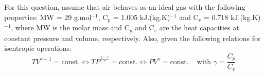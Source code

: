 \documentclass[calculator,steamtables,refrigeranttables,psychrometricchart,datasheet,solutions]{exam}
\newcommand{\frc}{\displaystyle\frac}
\begin{document}
\begin{question}
\begin{enumerate}[(a)]
\begin{enumerate}[(i)]
{}
%
\end{enumerate}

\end{enumerate}
For this question, assume that air behaves as an ideal gas with the following properties: MW = 29 g.mol$^{-1}$, C$_{p}$ = 1.005 kJ.(kg.K)$^{-1}$ and C$_{v}$ = 0.718 kJ.(kg.K)$^{-1}$, where MW is the molar mass and C$_{p}$ and C$_{v}$ are the heat capacities at constant pressure and volume, respectively. Also, given the following relations for isentropic operations:%
\begin{displaymath}
TV^{\gamma-1}=\text{const.} \Leftrightarrow TP^{\frac{1-\gamma}{\gamma}}=\text{const.} \Leftrightarrow PV^{\gamma}=\text{const.} \;\;\;\text{ with } \gamma = \frc{C_{p}}{C_{v}}
\end{displaymath}

\end{question}

\clearpage
\end{document}

